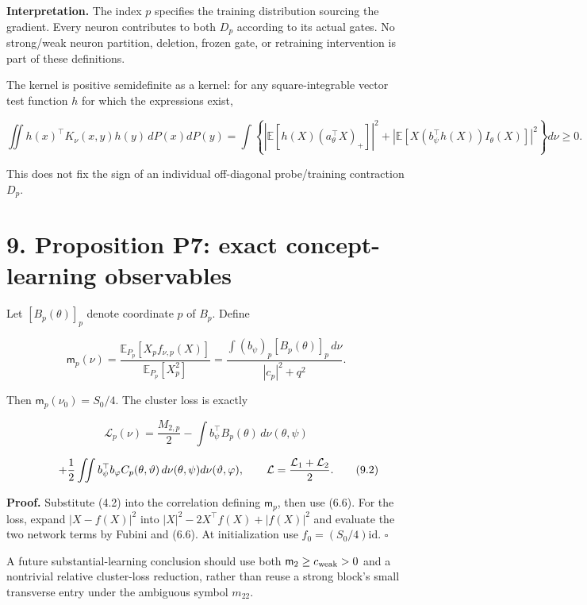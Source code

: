 \documentclass[
  10pt,
]{article}
\begin{document}
\textbf{Interpretation.} The index \(p\) specifies the training
distribution sourcing the gradient. Every neuron contributes to both
\(D_p\) according to its actual gates. No strong/weak neuron partition,
deletion, frozen gate, or retraining intervention is part of these
definitions.

The kernel is positive semidefinite as a kernel: for any
square-integrable vector test function \(h\) for which the expressions
exist,

\[
 \iint h(x)^\top K_\nu(x,y)h(y)\,dP(x)dP(y)
 =\int\left\{\left|\mathbb E[h(X)(a_\theta^\top X)_+]\right|^2
 +\left|\mathbb E[X(b_\psi^\top h(X))I_\theta(X)]\right|^2\right\}d\nu\ge0.
\]

This does not fix the sign of an individual off-diagonal probe/training
contraction \(D_p\).

\section{9. Proposition P7: exact concept-learning
observables}\label{proposition-p7-exact-concept-learning-observables}

Let \([B_p(\theta)]_p\) denote coordinate \(p\) of \(B_p\). Define

\[
 \mathsf m_p(\nu)=
 \frac{\mathbb E_{P_p}[X_p f_{\nu,p}(X)]}{\mathbb E_{P_p}[X_p^2]}
 =\frac{\int (b_\psi)_p[B_p(\theta)]_p\,d\nu}
 {|c_p|^2+q^2}.
 \tag{9.1}
\]

Then \(\mathsf m_p(\nu_0)=S_0/4\). The cluster loss is exactly

\[
 \mathcal L_p(\nu)=\frac{M_{2,p}}2
 -\int b_\psi^\top B_p(\theta)\,d\nu(\theta,\psi)
\]

\[
 \hspace{8mm}+\frac12\iint
 b_\psi^\top b_\varphi C_p(\theta,\vartheta)
 \,d\nu(\theta,\psi)d\nu(\vartheta,\varphi),
 \qquad \mathcal L=\frac{\mathcal L_1+\mathcal L_2}{2}.
 \tag{9.2}
\]

\textbf{Proof.} Substitute (4.2) into the correlation defining
\(\mathsf m_p\), then use (6.6). For the loss, expand \(|X-f(X)|^2\)
into \(|X|^2-2X^\top f(X)+|f(X)|^2\) and evaluate the two network terms
by Fubini and (6.6). At initialization use \(f_0=(S_0/4)\mathrm{id}\).
\(\square\)

A future substantial-learning conclusion should use both
\(\mathsf m_2\ge c_{\rm weak}>0\) and a nontrivial relative cluster-loss
reduction, rather than reuse a strong block's small transverse entry
under the ambiguous symbol \(m_{22}\).
\end{document}
